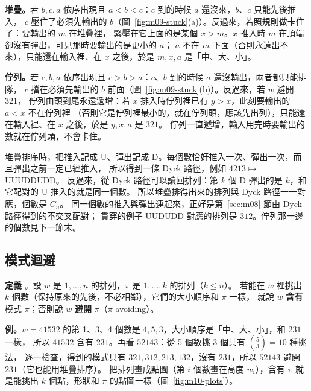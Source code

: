 \begin{notebox}[為什麼]
\textbf{堆疊。}若 $b,c,a$ 依序出現且 $a<b<c$：$c$ 到的時候 $a$ 還沒來，$b$、$c$ 只能先後推入，
$c$ 壓住了必須先輸出的 $b$（圖~\ref{fig:m09-stuck}(a)）。反過來，若照規則做卡住了：要輸出的 $m$ 在堆疊裡，
緊壓在它上面的是某個 $x>m$。$x$ 推入時 $m$ 在頂端卻沒有彈出，可見那時要輸出的是更小的 $a$；
$a$ 不在 $m$ 下面（否則永遠出不來），只能還在輸入裡、在 $x$ 之後，於是 $m,x,a$ 是「中、大、小」。

\textbf{佇列。}若 $c,b,a$ 依序出現且 $c>b>a$：$c$、$b$ 到的時候 $a$ 還沒輸出，兩者都只能排隊，
$c$ 擋在必須先輸出的 $b$ 前面（圖~\ref{fig:m09-stuck}(b)）。反過來，若 $w$ 避開 $321$，
佇列由頭到尾永遠遞增：若 $x$ 排入時佇列裡已有 $y>x$，此刻要輸出的 $a<x$ 不在佇列裡
（否則它是佇列裡最小的，就在佇列頭，應該先出列），只能還在輸入裡、在 $x$ 之後，於是 $y,x,a$ 是 $321$。
佇列一直遞增，輸入用完時要輸出的數就在佇列頭，不會卡住。
\end{notebox}

\begin{keybox}[推入 $=$ U，彈出 $=$ D]
堆疊排序時，把推入記成 U、彈出記成 D。每個數恰好推入一次、彈出一次，而且彈出之前一定已經推入，
所以得到一條 Dyck 路徑，例如 $4213\mapsto$ UUUDDUDD。
反過來，從 Dyck 路徑可以讀回排列：第 $k$ 個 D 彈出的是 $k$，和它配對的 U 推入的就是同一個數。
所以堆疊排得出來的排列與 Dyck 路徑一一對應，個數是 $C_n$。
同一個數的推入與彈出連起來，正好是第~\ref{sec:m08} 節由 Dyck 路徑得到的不交叉配對；
貫穿的例子 UUDUDD 對應的排列是 $312$。佇列那一邊的個數見下一節末。
\end{keybox}

\subsection{模式迴避}\label{sec:m10}

\textbf{定義} 。設 $w$ 是 $1,\ldots,n$ 的排列，$\pi$ 是 $1,\ldots,k$ 的排列（$k\le n$）。
若能在 $w$ 裡挑出 $k$ 個數（保持原來的先後，不必相鄰），它們的大小順序和 $\pi$ 一樣，
就說 $w$ \textbf{含有}模式 $\pi$；否則說 $w$ \textbf{避開} $\pi$（$\pi$-avoiding）。

\textbf{例。}$w=41532$ 的第 1、3、4 個數是 $4,5,3$，大小順序是「中、大、小」，和 $231$ 一樣，
所以 $41532$ 含有 $231$。再看 $52143$：從 5 個數挑 3 個共有 $\binom{5}{3}=10$ 種挑法，
逐一檢查，得到的模式只有 $321,312,213,132$，沒有 $231$，所以 $52143$ 避開 $231$（它也能用堆疊排序）。
把排列畫成點圖（第 $i$ 個數畫在高度 $w_i$），含有 $\pi$ 就是能挑出 $k$ 個點，形狀和 $\pi$ 的點圖一樣（圖~\ref{fig:m10-plots}）。

